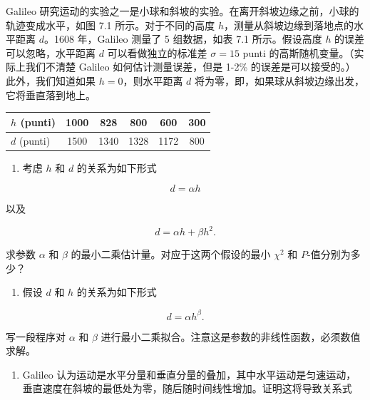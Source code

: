 ﻿


\begin{question}
Galileo
研究运动的实验之一是小球和斜坡的实验。在离开斜坡边缘之前，小球的轨迹变成水平，如图
7.1 所示。对于不同的高度 \(h\)，测量从斜坡边缘到落地点的水平距离
\(d\)。1608 年，Galileo 测量了 5 组数据，如表 7.1 所示。假设高度 \(h\)
的误差可以忽略，水平距离 \(d\) 可以看做独立的标准差 \(\sigma=15\) punti
的高斯随机变量。（实际上我们不清楚 Galileo 如何估计测量误差，但是 1-2\%
的误差是可以接受的。）此外，我们知道如果 \(h=0\)，则水平距离 \(d\)
将为零，即，如果球从斜坡边缘出发，它将垂直落到地上。


\begin{center}
\begin{tabular}{lccccc}
\toprule
\(h\) (punti) & 1000 & 828 & 800 & 600 & 300 \\
\midrule
\(d\) (punti) & 1500 & 1340 & 1328 & 1172 & 800 \\
\bottomrule
\end{tabular}
\par{}
\end{center}

\begin{enumerate}
\item
  考虑 \(h\) 和 \(d\) 的关系为如下形式
\end{enumerate}

\[
d=\alpha h
\]

以及

\[
d=\alpha h+\beta h^2.
\]

求参数 \(\alpha\) 和 \(\beta\) 的最小二乘估计量。对应于这两个假设的最小
\(\chi^2\) 和 \(P\)-值分别为多少？

\begin{enumerate}[start=2]
\item
  假设 \(d\) 和 \(h\) 的关系为如下形式
\end{enumerate}

\[
d=\alpha h^\beta.
\]

写一段程序对 \(\alpha\) 和 \(\beta\)
进行最小二乘拟合。注意这是参数的非线性函数，必须数值求解。

\begin{enumerate}[start=3]
\item
  Galileo
  认为运动是水平分量和垂直分量的叠加，其中水平运动是匀速运动，垂直速度在斜坡的最低处为零，随后随时间线性增加。证明这将导致关系式
\end{enumerate}


\end{question}

